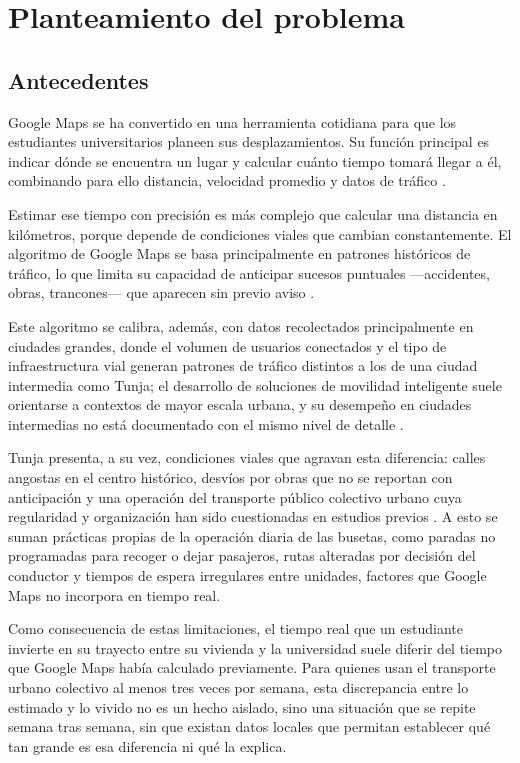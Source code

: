 \section{Planteamiento del problema}
\subsection{Antecedentes}

Google Maps se ha convertido en una herramienta cotidiana para que los estudiantes
universitarios planeen sus desplazamientos. Su función principal es indicar dónde se
encuentra un lugar y calcular cuánto tiempo tomará llegar a él, combinando para ello
distancia, velocidad promedio y datos de tráfico \cite{salvatierra2023}.

Estimar ese tiempo con precisión es más complejo que calcular una distancia en
kilómetros, porque depende de condiciones viales que cambian constantemente. El
algoritmo de Google Maps se basa principalmente en patrones históricos de tráfico, lo
que limita su capacidad de anticipar sucesos puntuales —accidentes, obras,
trancones— que aparecen sin previo aviso \cite{thanuja2026}.

Este algoritmo se calibra, además, con datos recolectados principalmente en ciudades
grandes, donde el volumen de usuarios conectados y el tipo de infraestructura vial
generan patrones de tráfico distintos a los de una ciudad intermedia como Tunja; el
desarrollo de soluciones de movilidad inteligente suele orientarse a contextos de
mayor escala urbana, y su desempeño en ciudades intermedias no está documentado con
el mismo nivel de detalle \cite{pulido2024}.

Tunja presenta, a su vez, condiciones viales que agravan esta diferencia: calles
angostas en el centro histórico, desvíos por obras que no se reportan con
anticipación y una operación del transporte público colectivo urbano cuya
regularidad y organización han sido cuestionadas en estudios previos
\cite{munoz2019}. A esto se suman prácticas propias de la operación diaria de las
busetas, como paradas no programadas para recoger o dejar pasajeros, rutas alteradas
por decisión del conductor y tiempos de espera irregulares entre unidades, factores
que Google Maps no incorpora en tiempo real.

Como consecuencia de estas limitaciones, el tiempo real que un estudiante invierte en
su trayecto entre su vivienda y la universidad suele diferir del tiempo que Google
Maps había calculado previamente. Para quienes usan el transporte urbano colectivo al
menos tres veces por semana, esta discrepancia entre lo estimado y lo vivido no es un
hecho aislado, sino una situación que se repite semana tras semana, sin que existan
datos locales que permitan establecer qué tan grande es esa diferencia ni qué la
explica.


